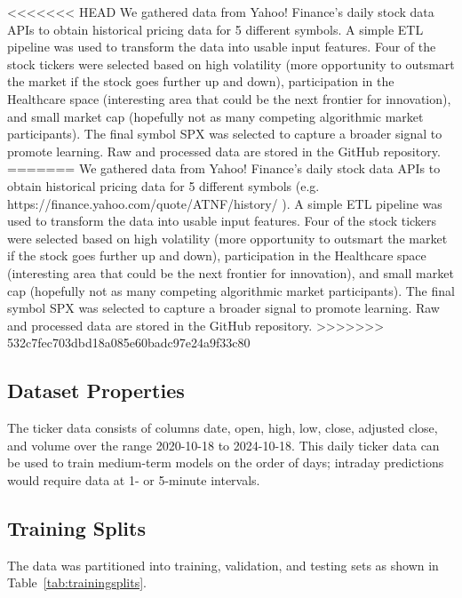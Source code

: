 \documentclass[10pt,twocolumn,letterpaper]{article}
\begin{document}
<<<<<<< HEAD
We gathered data from Yahoo! Finance’s daily stock data APIs to obtain historical pricing data for 5 different symbols\cite{yahoo_finance_api,yfinance}. A simple ETL pipeline was used to transform the data into usable input features. Four of the stock tickers were selected based on high volatility (more opportunity to outsmart the market if the stock goes further up and down), participation in the Healthcare space (interesting area that could be the next frontier for innovation), and small market cap (hopefully not as many competing algorithmic market participants). The final symbol SPX was selected to capture a broader signal to promote learning. Raw and processed data are stored in the GitHub repository.
=======
We gathered data from Yahoo! Finance’s daily stock data APIs to obtain historical pricing data for 5 different symbols (e.g. https://finance.yahoo.com/quote/ATNF/history/ \cite{we should just cite yfinance or yahoo website here imo}). A simple ETL pipeline was used to transform the data into usable input features. Four of the stock tickers were selected based on high volatility (more opportunity to outsmart the market if the stock goes further up and down), participation in the Healthcare space (interesting area that could be the next frontier for innovation), and small market cap (hopefully not as many competing algorithmic market participants). The final symbol SPX was selected to capture a broader signal to promote learning. Raw and processed data are stored in the GitHub repository.
>>>>>>> 532c7fec703dbd18a085e60badc97e24a9f33c80

\subsection{Dataset Properties}

The ticker data consists of columns date, open, high, low, close, adjusted close, and volume over the range 2020-10-18 to 2024-10-18. This daily ticker data can be used to train medium-term models on the order of days; intraday predictions would require data at 1- or 5-minute intervals.

\subsection{Training Splits}

The data was partitioned into training, validation, and testing sets as shown in Table~\ref{tab:trainingsplits}.

\end{document}
